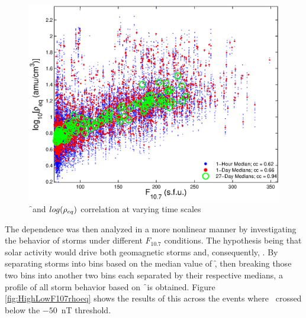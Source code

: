 \begin{figure}[htp!]
	\centering
	\includegraphics[width=0.55\linewidth]{Figures/ccplot-GOES6}
	\caption{\f\ and $log(\rho_{eq})$ correlation at varying time scales}
	\label{fig:ccplot}
\end{figure}


The dependence was then analyzed in a more nonlinear manner by investigating the behavior of storms under different $F_{10.7}$ conditions. The hypothesis being that solar activity would drive both geomagnetic storms and, consequently, \req. By separating storms into bins based on the median value of \f, then breaking those two bins into another two bins each separated by their respective medians, a profile of all storm behavior based on \f\ is obtained. Figure \ref{fig:HighLowF107rhoeq} shows the results of this across the events where \dst\ crossed below the $-50$~nT threshold. 


